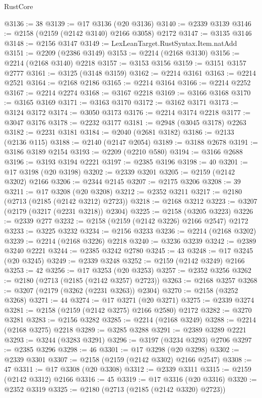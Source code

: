 \begin{lexlean}{RustCore}
\begin{coremodule}
@3136 := 38
@3139 := @17 @3136 (@20 @3136)
@3140 := @2339 @3139
@3146 := @2158 (@2159 (@2142 @3140) @2166 @3058) @2172
@3147 := @3135 @3146
@3148 := @2156 @3147
@3149 := LexLeanTarget.RustSyntax.Item.natAdd
@3151 := @2209 (@2386 @3149)
@3153 := @2214 (@2168 @3130)
@3156 := @2214 (@2168 @3140) @2218
@3157 := @3153 @3156
@3159 := @3151 @3157 @2777
@3161 := @3125 (@3148 @3159)
@3162 := @2214 @3161
@3163 := @2214 @2521
@3164 := @2168 @2186
@3165 := @2214 @3164
@3166 := @2214 @2252
@3167 := @2214 @2274
@3168 := @3167 @2218
@3169 := @3166 @3168
@3170 := @3165 @3169
@3171 := @3163 @3170
@3172 := @3162 @3171
@3173 := @3124 @3172
@3174 := @3050 @3173
@3176 := @2214 @3174 @2218
@3177 := @3047 @3176
@3178 := @2232 @3177
@3181 := @2948 (@3045 @3178) @2263
@3182 := @2231 @3181
@3184 := @2040 (@2681 @3182)
@3186 := @2133 (@2136 @115)
@3188 := @2140 (@2147 @2054)
@3189 := @3188 @2678
@3191 := @3186 @3189 @2154
@3193 := @2209 (@2210 @580)
@3194 := @3166 @2688
@3196 := @3193 @3194 @2221
@3197 := @2385 @3196
@3198 := 40
@3201 := @17 @3198 (@20 @3198)
@3202 := @2339 @3201
@3205 := @2159 (@2142 @3202) @2166
@3206 := @2344 @2145
@3207 := @2175 @3206
@3208 := 39
@3211 := @17 @3208 (@20 @3208)
@3212 := @2352 @3211
@3217 := @2180 (@2713 (@2185 (@2142 @3212) @2723))
@3218 := @2168 @3212
@3223 := @3207 (@2179 (@3217 (@2231 @3218)) @2304)
@3225 := @2158 (@3205 @3223)
@3226 := @2339 @277
@3232 := @2158 (@2159 (@2142 @3226) @2166 @2547) @2172
@3233 := @3225 @3232
@3234 := @2156 @3233
@3236 := @2214 (@2168 @3202)
@3239 := @2214 (@2168 @3226) @2218
@3240 := @3236 @3239
@3242 := @2389 @3240 @2221
@3244 := @2385 @3242 @2780
@3245 := 43
@3248 := @17 @3245 (@20 @3245)
@3249 := @2339 @3248
@3252 := @2159 (@2142 @3249) @2166
@3253 := 42
@3256 := @17 @3253 (@20 @3253)
@3257 := @2352 @3256
@3262 := @2180 (@2713 (@2185 (@2142 @3257) @2723))
@3263 := @2168 @3257
@3268 := @3207 (@2179 (@3262 (@2231 @3263)) @2304)
@3270 := @2158 (@3252 @3268)
@3271 := 44
@3274 := @17 @3271 (@20 @3271)
@3275 := @2339 @3274
@3281 := @2158 (@2159 (@2142 @3275) @2166 @2580) @2172
@3282 := @3270 @3281
@3283 := @2156 @3282
@3285 := @2214 (@2168 @3249)
@3288 := @2214 (@2168 @3275) @2218
@3289 := @3285 @3288
@3291 := @2389 @3289 @2221
@3293 := @3244 (@3283 @3291)
@3296 := @3197 (@3234 @3293) @2706
@3297 := @2385 @3296
@3298 := 46
@3301 := @17 @3298 (@20 @3298)
@3302 := @2339 @3301
@3307 := @2158 (@2159 (@2142 @3302) @2166 @2547)
@3308 := 47
@3311 := @17 @3308 (@20 @3308)
@3312 := @2339 @3311
@3315 := @2159 (@2142 @3312) @2166
@3316 := 45
@3319 := @17 @3316 (@20 @3316)
@3320 := @2352 @3319
@3325 := @2180 (@2713 (@2185 (@2142 @3320) @2723))

\end{coremodule}
\end{lexlean}
